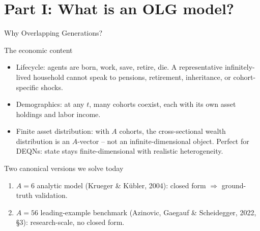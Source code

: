 \documentclass[aspectratio=169,11pt]{beamer}
\newcommand{\emphc}[1]{\textcolor{harvardcrimson}{#1}}
\begin{document}

\section{Part I: What is an OLG model?}

\begin{frame}{Why Overlapping Generations?}
\footnotesize
\begin{block}{The economic content}
\vspace{-3pt}\begin{itemize}\itemsep2pt
    \item \emphc{Lifecycle:} agents are born, work, save, retire, die.  A representative infinitely-lived household cannot speak to pensions, retirement, inheritance, or cohort-specific shocks.
    \item \emphc{Demographics:} at any $t$, many cohorts coexist, each with its own asset holdings and labor income.
    \item \emphc{Finite asset distribution:} with $A$ cohorts, the cross-sectional wealth distribution is an $A$-vector -- not an infinite-dimensional object.  \emphc{Perfect for DEQNs:} state stays finite-dimensional with realistic heterogeneity.
\end{itemize}
\end{block}
\vspace{-3pt}
\begin{block}{Two canonical versions we solve today}
\vspace{-3pt}\begin{enumerate}\itemsep1pt
    \item $A=6$ analytic model (Krueger \& K\"ubler, 2004): closed form $\Rightarrow$ ground-truth validation.
    \item $A=56$ leading-example benchmark (Azinovic, Gaegauf \& Scheidegger, 2022, \S 3): research-scale, no closed form.
\end{enumerate}
\end{block}
\end{frame}
\end{document}
